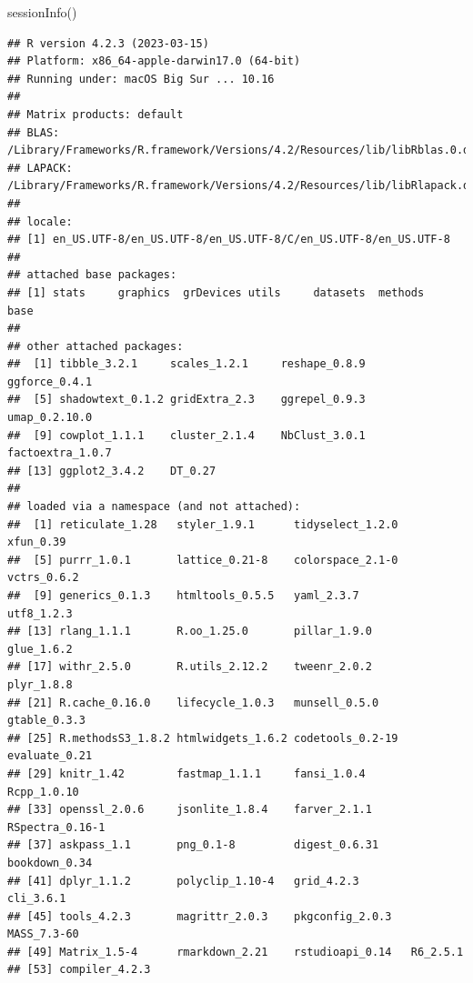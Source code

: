 \documentclass[
  11pt,
  oneside]{book}
\newenvironment{Shaded}{\begin{snugshade}}{\end{snugshade}}
\newcommand{\AttributeTok}[1]{\textcolor[rgb]{0.77,0.63,0.00}{#1}}
\newcommand{\CommentTok}[1]{\textcolor[rgb]{0.56,0.35,0.01}{\textit{#1}}}
\newcommand{\ConstantTok}[1]{\textcolor[rgb]{0.00,0.00,0.00}{#1}}
\newcommand{\FunctionTok}[1]{\textcolor[rgb]{0.00,0.00,0.00}{#1}}
\newcommand{\NormalTok}[1]{#1}
\newcommand{\OtherTok}[1]{\textcolor[rgb]{0.56,0.35,0.01}{#1}}
\newcommand{\SpecialCharTok}[1]{\textcolor[rgb]{0.00,0.00,0.00}{#1}}
\newcommand{\StringTok}[1]{\textcolor[rgb]{0.31,0.60,0.02}{#1}}
\begin{document}
\begin{Shaded}
\end{Shaded}

\begin{Shaded}
\begin{Highlighting}[]
\FunctionTok{sessionInfo}\NormalTok{()}
\end{Highlighting}
\end{Shaded}

\begin{verbatim}
## R version 4.2.3 (2023-03-15)
## Platform: x86_64-apple-darwin17.0 (64-bit)
## Running under: macOS Big Sur ... 10.16
## 
## Matrix products: default
## BLAS:   /Library/Frameworks/R.framework/Versions/4.2/Resources/lib/libRblas.0.dylib
## LAPACK: /Library/Frameworks/R.framework/Versions/4.2/Resources/lib/libRlapack.dylib
## 
## locale:
## [1] en_US.UTF-8/en_US.UTF-8/en_US.UTF-8/C/en_US.UTF-8/en_US.UTF-8
## 
## attached base packages:
## [1] stats     graphics  grDevices utils     datasets  methods   base     
## 
## other attached packages:
##  [1] tibble_3.2.1     scales_1.2.1     reshape_0.8.9    ggforce_0.4.1   
##  [5] shadowtext_0.1.2 gridExtra_2.3    ggrepel_0.9.3    umap_0.2.10.0   
##  [9] cowplot_1.1.1    cluster_2.1.4    NbClust_3.0.1    factoextra_1.0.7
## [13] ggplot2_3.4.2    DT_0.27         
## 
## loaded via a namespace (and not attached):
##  [1] reticulate_1.28   styler_1.9.1      tidyselect_1.2.0  xfun_0.39        
##  [5] purrr_1.0.1       lattice_0.21-8    colorspace_2.1-0  vctrs_0.6.2      
##  [9] generics_0.1.3    htmltools_0.5.5   yaml_2.3.7        utf8_1.2.3       
## [13] rlang_1.1.1       R.oo_1.25.0       pillar_1.9.0      glue_1.6.2       
## [17] withr_2.5.0       R.utils_2.12.2    tweenr_2.0.2      plyr_1.8.8       
## [21] R.cache_0.16.0    lifecycle_1.0.3   munsell_0.5.0     gtable_0.3.3     
## [25] R.methodsS3_1.8.2 htmlwidgets_1.6.2 codetools_0.2-19  evaluate_0.21    
## [29] knitr_1.42        fastmap_1.1.1     fansi_1.0.4       Rcpp_1.0.10      
## [33] openssl_2.0.6     jsonlite_1.8.4    farver_2.1.1      RSpectra_0.16-1  
## [37] askpass_1.1       png_0.1-8         digest_0.6.31     bookdown_0.34    
## [41] dplyr_1.1.2       polyclip_1.10-4   grid_4.2.3        cli_3.6.1        
## [45] tools_4.2.3       magrittr_2.0.3    pkgconfig_2.0.3   MASS_7.3-60      
## [49] Matrix_1.5-4      rmarkdown_2.21    rstudioapi_0.14   R6_2.5.1         
## [53] compiler_4.2.3
\end{verbatim}
\end{document}
